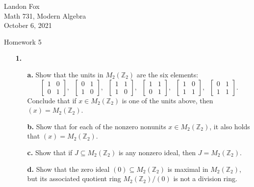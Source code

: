 \documentclass[ 12pt ]{article}
\begin{document}
\noindent Landon Fox \\
\noindent Math 731, Modern Algebra \\
\noindent October 6, 2021

\begin{center}
\Large Homework 5
\end{center}

\begin{enumerate}
	\item[\textbf{1.}]
	\begin{enumerate}
		\item[\textbf{a.}] Show that the units in $M_2(\mathbb{Z}_2)$ are the six elements: $$\begin{bmatrix} 1 & 0 \\ 0 & 1 \end{bmatrix},\;\; \begin{bmatrix} 0 & 1 \\ 1 & 0 \end{bmatrix},\;\; \begin{bmatrix} 1 & 1 \\ 1 & 0 \end{bmatrix},\;\; \begin{bmatrix} 1 & 1 \\ 0 & 1 \end{bmatrix},\;\; \begin{bmatrix} 1 & 0 \\ 1 & 1 \end{bmatrix},\;\; \begin{bmatrix} 0 & 1 \\ 1 & 1 \end{bmatrix}.$$ Conclude that if $x \in M_2(\mathbb{Z}_2)$ is one of the units above, then $(x) = M_2(\mathbb{Z}_2)$.
		\item[\textbf{b.}] Show that for each of the nonzero nonunits $x \in M_2(\mathbb{Z}_2)$, it also holds that $(x) = M_2(\mathbb{Z}_2)$.
		\item[\textbf{c.}] Show that if $J \subseteq M_2(\mathbb{Z}_2)$ is any nonzero ideal, then $J = M_2(\mathbb{Z}_2)$.
		\item[\textbf{d.}] Show that the zero ideal $(0) \subseteq M_2(\mathbb{Z}_2)$ is maximal in $M_2(\mathbb{Z}_2)$, but its associated quotient ring $M_2(\mathbb{Z}_2)/(0)$ is not a division ring.
	\end{enumerate}


\end{enumerate}
\end{document}
